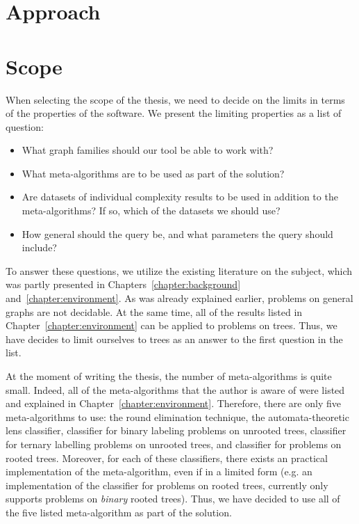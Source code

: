 \section{Approach}



\section{Scope}

When selecting the scope of the thesis, we need to decide on the limits
in terms of the properties of the software. We present the limiting properties
as a list of question:

\begin{itemize}
  \item What graph families should our tool be able to work with?
  \item What meta-algorithms are to be used as part of the solution?
  \item Are datasets of individual complexity results to be used
  in addition to the meta-algorithms? If so, which of the datasets we should use?
  \item How general should the query be, and what parameters the query should include?
\end{itemize}

To answer these questions, we utilize the existing literature on the subject, which was partly presented in Chapters~\ref{chapter:background} and~\ref{chapter:environment}. As was already explained earlier, problems on general graphs are not decidable. At the same time, all of the results listed in Chapter~\ref{chapter:environment} can be applied to problems on trees. Thus,
we have decides to limit ourselves to trees as an answer to the first question in the list.

At the moment of writing the thesis, the number of meta-algorithms is
quite small. Indeed, all of the meta-algorithms that the author is aware of were listed and explained in Chapter~\ref{chapter:environment}. Therefore, there are only five meta-algorithms to use: the round elimination technique, the automata-theoretic lens classifier, classifier for binary labeling problems on unrooted trees, classifier for ternary labelling problems on unrooted trees, and classifier for problems on rooted trees. Moreover, for each of these classifiers, there exists an practical implementation of the meta-algorithm, even if in a limited form (e.g. an implementation of the classifier for problems on rooted trees, currently only supports problems on \emph{binary} rooted trees). Thus, we have decided to use all of the five listed meta-algorithm as part of the solution.

